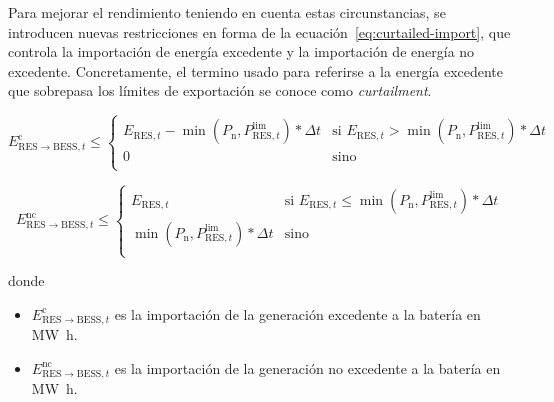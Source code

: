 Para mejorar el rendimiento teniendo en cuenta estas circunstancias, se introducen nuevas restricciones en forma de la ecuación~\ref{eq:curtailed-import}, que controla la importación de energía excedente y la importación de energía no excedente. Concretamente, el termino usado para referirse a la energía excedente que sobrepasa los límites de exportación se conoce como \textit{curtailment}.

\begin{samepage}%
  \label{eq:curtailed-import}

  \begin{equation}%
    E^{\mathrm{c}}_{\mathrm{RES} \rightarrow \mathrm{BESS}, t} \le
    \begin{cases}
      E_{\mathrm{RES}, t} - \min\left(P_{\mathrm{n}}, P^{\text{lim}}_{\mathrm{RES}, t}\right) * \Delta t & \text{si } E_{\mathrm{RES}, t} > \min\left(P_{\mathrm{n}}, P^{\text{lim}}_{\mathrm{RES}, t}\right) * \Delta t \\
      0                                                                                                  & \text{sino}                                                                                                   \\
    \end{cases}
  \end{equation}

  \begin{equation}%
    E^{\mathrm{nc}}_{\mathrm{RES} \rightarrow \mathrm{BESS}, t} \le
    \begin{cases}
      E_{\mathrm{RES}, t}                                                          & \text{si } E_{\mathrm{RES}, t} \le \min\left(P_{\mathrm{n}}, P^{\text{lim}}_{\mathrm{RES}, t}\right) * \Delta t \\
      \min\left(P_{\mathrm{n}}, P^{\text{lim}}_{\mathrm{RES}, t}\right) * \Delta t & \text{sino}                                                                                                     \\
    \end{cases}
  \end{equation}

  donde

  \begin{itemize}

    \item \( E^{\mathrm{c}}_{\mathrm{RES} \rightarrow \mathrm{BESS}, t} \) es la importación de la generación excedente a la batería en \si{{\mega\watt\hour}}.

    \item \( E^{\mathrm{nc}}_{\mathrm{RES} \rightarrow \mathrm{BESS}, t} \) es la importación de la generación no excedente a la batería en \si{{\mega\watt\hour}}.

  \end{itemize}

\end{samepage}

